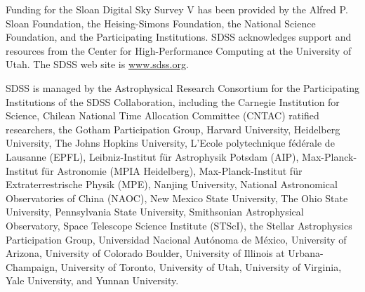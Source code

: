 \documentclass[modern, linenumbers]{aastex631}
\begin{document}
Funding for the Sloan Digital Sky Survey V has been provided by the Alfred P. Sloan Foundation, the Heising-Simons Foundation, the National Science Foundation, and the Participating Institutions. SDSS acknowledges support and resources from the Center for High-Performance Computing at the University of Utah. The SDSS web site is \url{www.sdss.org}.

SDSS is managed by the Astrophysical Research Consortium for the Participating Institutions of the SDSS Collaboration, including the Carnegie Institution for Science, Chilean National Time Allocation Committee (CNTAC) ratified researchers, the Gotham Participation Group, Harvard University, Heidelberg University, The Johns Hopkins University, L’Ecole polytechnique f\'{e}d\'{e}rale de Lausanne (EPFL), Leibniz-Institut f{\"u}r Astrophysik Potsdam (AIP), Max-Planck-Institut f{\"u}r Astronomie (MPIA Heidelberg), Max-Planck-Institut f{\"u}r Extraterrestrische Physik (MPE), Nanjing University, National Astronomical Observatories of China (NAOC), New Mexico State University, The Ohio State University, Pennsylvania State University, Smithsonian Astrophysical Observatory, Space Telescope Science Institute (STScI), the Stellar Astrophysics Participation Group, Universidad Nacional Aut\'{o}noma de M\'{e}xico, University of Arizona, University of Colorado Boulder, University of Illinois at Urbana-Champaign, University of Toronto, University of Utah, University of Virginia, Yale University, and Yunnan University.




{}

\end{document}

